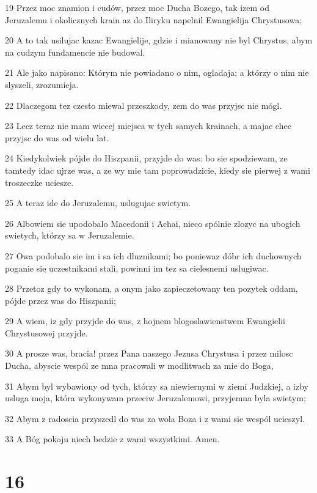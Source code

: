 \par 19 Przez moc znamion i cudów, przez moc Ducha Bozego, tak izem od Jeruzalemu i okolicznych krain az do Iliryku napelnil Ewangielija Chrystusowa;
\par 20 A to tak usilujac kazac Ewangielije, gdzie i mianowany nie byl Chrystus, abym na cudzym fundamencie nie budowal.
\par 21 Ale jako napisano: Którym nie powiadano o nim, ogladaja; a którzy o nim nie slyszeli, zrozumieja.
\par 22 Dlaczegom tez czesto miewal przeszkody, zem do was przyjsc nie mógl.
\par 23 Lecz teraz nie mam wiecej miejsca w tych samych krainach, a majac chec przyjsc do was od wielu lat.
\par 24 Kiedykolwiek pójde do Hiszpanii, przyjde do was: bo sie spodziewam, ze tamtedy idac ujrze was, a ze wy mie tam poprowadzicie, kiedy sie pierwej z wami troszeczke uciesze.
\par 25 A teraz ide do Jeruzalemu, uslugujac swietym.
\par 26 Albowiem sie upodobalo Macedonii i Achai, nieco spólnie zlozyc na ubogich swietych, którzy sa w Jeruzalemie.
\par 27 Owa podobalo sie im i sa ich dluznikami; bo poniewaz dóbr ich duchownych poganie sie uczestnikami stali, powinni im tez sa cielesnemi uslugiwac.
\par 28 Przetoz gdy to wykonam, a onym jako zapieczetowany ten pozytek oddam, pójde przez was do Hiszpanii;
\par 29 A wiem, iz gdy przyjde do was, z hojnem blogoslawienstwem Ewangielii Chrystusowej przyjde.
\par 30 A prosze was, bracia! przez Pana naszego Jezusa Chrystusa i przez milosc Ducha, abyscie wespól ze mna pracowali w modlitwach za mie do Boga,
\par 31 Abym byl wybawiony od tych, którzy sa niewiernymi w ziemi Judzkiej, a izby usluga moja, która wykonywam przeciw Jeruzalemowi, przyjemna byla swietym;
\par 32 Abym z radoscia przyszedl do was za wola Boza i z wami sie wespól ucieszyl.
\par 33 A Bóg pokoju niech bedzie z wami wszystkimi. Amen.

\chapter{16}

